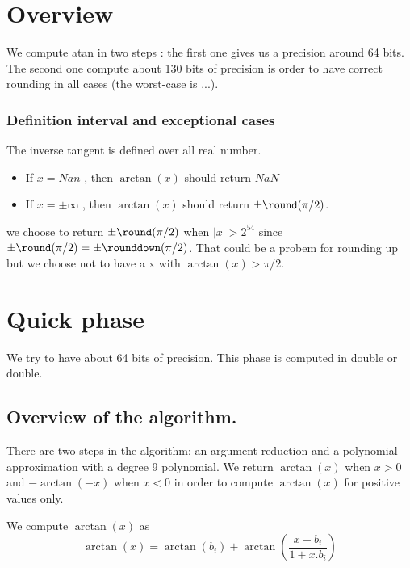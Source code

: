 \newcommand{\xred}{X_{\mathrm{red}}}
\newcommand{\xredhi}{X_{\mathrm{red hi}}}
\newcommand{\xredlo}{X_{\mathrm{red lo}}}

\section{Overview}

We compute atan in two steps : the first one gives us a precision around 64
bits. The second one compute about 130 bits of precision is order to have
correct rounding in all cases (the worst-case is ...).

\subsubsection{Definition interval and exceptional cases}

The inverse tangent is defined over all real number.

\begin{itemize}
\item If $x = Nan$ , then $\arctan(x)$ should return $NaN$
\item If $x = \pm\infty$ , then $\arctan(x)$ should return
$\pm\round(\pi/2)$. 
\end{itemize}
we choose to return $\pm\round(\pi/2)$ when $|x|>2^{54}$ since
$\pm\round(\pi/2) =\pm\rounddown(\pi/2) $. That could be a probem for
rounding up but we choose not to have a x with $\arctan(x) > \pi/2$.
\section{Quick phase}

We try to have about 64 bits of precision. This phase is computed in double
or double.

\subsection{Overview of the algorithm.}

There are two steps in the algorithm: an argument reduction and a polynomial
approximation with a degree 9 polynomial. We return $\arctan(x)$ when
$x>0$ and $-\arctan(-x)$ when $x<0$ in order to compute $\arctan(x)$ for positive
values only.

We compute $\arctan(x)$ as 
\begin{equation}
\arctan(x) = \arctan( b_i ) + \arctan(\frac{x-b_i}{1+x.b_i}) \label{eq:arctan_redu}
\end{equation}

